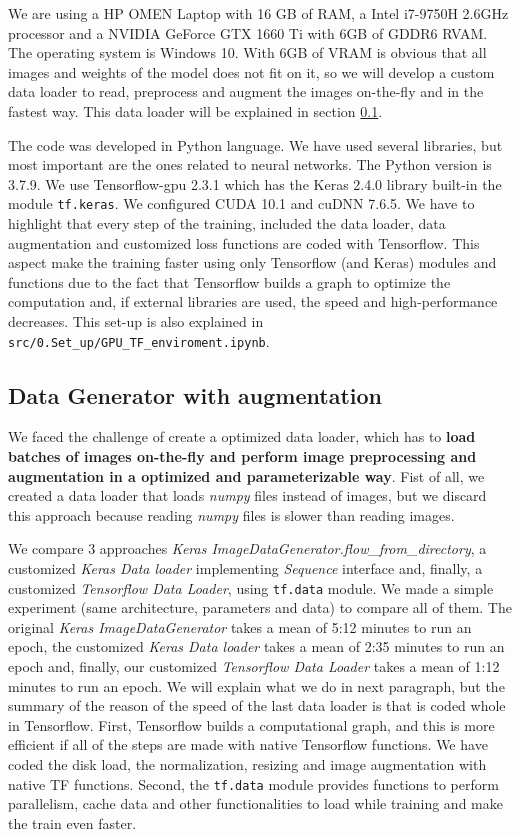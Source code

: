 We are using a HP OMEN Laptop with 16 GB of RAM, a Intel i7-9750H 2.6GHz processor and a NVIDIA GeForce GTX 1660 Ti with 6GB of GDDR6 RVAM. The operating system is Windows 10. With 6GB of VRAM is obvious that all images and weights of the model does not fit on it, so we will develop a custom data loader to read, preprocess and augment the images on-the-fly and in the fastest way. This data loader will be explained in section \ref{subsection:loader}.

The code was developed in Python language. We have used several libraries, but most important are the ones related to neural networks. The Python version is 3.7.9. We use Tensorflow-gpu 2.3.1 which has the Keras 2.4.0 library built-in the module \texttt{tf.keras}. We configured CUDA 10.1 and cuDNN 7.6.5. We have to highlight that every step of the training, included the data loader, data augmentation and customized loss functions are coded with Tensorflow. This aspect make the training faster using only Tensorflow (and Keras) modules and functions due to the fact that Tensorflow builds a graph to optimize the computation and, if external libraries are used, the speed and high-performance decreases. This set-up is also explained in \texttt{src/\-0.Set\-\_up/\-GPU\_TF\_\-enviroment.ipynb}.

\subsection{Data Generator with augmentation}
\label{subsection:loader}

We faced the challenge of create a optimized data loader, which has to \textbf{load batches of images on-the-fly and perform image preprocessing and augmentation in a optimized and parameterizable way}. Fist of all, we created a data loader that loads \textit{numpy} files instead of images, but we discard this approach because reading \textit{numpy} files is slower than reading images.

We compare 3 approaches \textit{Keras ImageDataGenerator.flow\_from\_directory}, a customized \textit{Keras Data loader} implementing \textit{Sequence} interface and, finally, a customized \textit{Tensorflow Data Loader}, using \texttt{tf.data} module. We made a simple experiment (same architecture, parameters and data) to compare all of them. The original \textit{Keras ImageDataGenerator} takes a mean of 5:12 minutes to run an epoch, the customized \textit{Keras Data loader} takes a mean of 2:35 minutes to run an epoch and, finally, our customized \textit{Tensorflow Data Loader} takes a mean of 1:12 minutes to run an epoch. We will explain what we do in next paragraph, but the summary of the reason of the speed of the last data loader is that is coded whole in Tensorflow. First, Tensorflow builds a computational graph, and this is more efficient if all of the steps are made with native Tensorflow functions. We have coded the disk load, the normalization, resizing and image augmentation with native TF functions. Second, the \texttt{tf.data} module provides functions to perform parallelism, cache data and other functionalities to load while training and make the train even faster.

